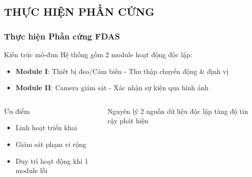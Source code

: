 \subsection{THỰC HIỆN PHẦN CỨNG}
\begin{frame}
\frametitle{Thực hiện Phần cứng FDAS}

\begin{block}{Kiến trúc mô-đun}
Hệ thống gồm 2 module hoạt động độc lập:
\begin{itemize}
\item \textbf{Module I}: Thiết bị đeo/Cảm biến - Thu thập chuyển động \& định vị
\item \textbf{Module II}: Camera giám sát - Xác nhận sự kiện qua hình ảnh
\end{itemize}
\end{block}

\begin{columns}
\begin{alertblock}{Ưu điểm}
\begin{itemize}
\item Linh hoạt triển khai
\item Giám sát phạm vi rộng  
\item Duy trì hoạt động khi 1 module lỗi
\end{itemize}
\end{alertblock}

\begin{block}{Nguyên lý}
2 nguồn dữ liệu độc lập tăng độ tin cậy phát hiện
\end{block}
\end{columns}

\end{frame}

